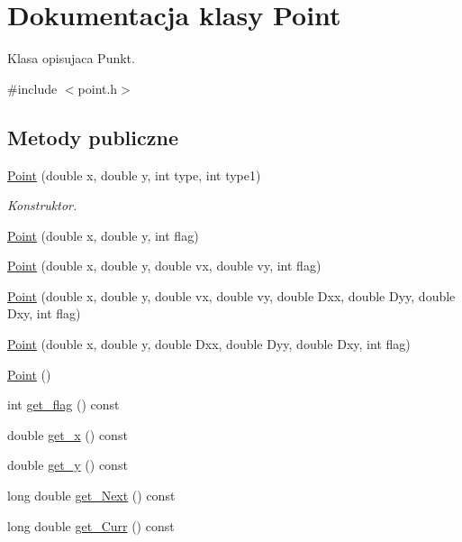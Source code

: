 \hypertarget{class_point}{}\section{Dokumentacja klasy Point}
\label{class_point}


Klasa opisujaca Punkt.  




{\ttfamily \#include $<$point.\+h$>$}

\subsection*{Metody publiczne}
\begin{DoxyCompactItemize}
\item 
\hyperlink{class_point_ac7a42329250c07c3f7e8c688ab1c1fcb}{Point} (double x, double y, int type, int type1)
\begin{DoxyCompactList}\small\item\em Konstruktor. \end{DoxyCompactList}\item 
\hyperlink{class_point_ac77aa12fe810c6a1409fb63c64a70521}{Point} (double x, double y, int flag)
\item 
\hyperlink{class_point_aa26891d8be99659f996873b6cf3e6a9c}{Point} (double x, double y, double vx, double vy, int flag)
\item 
\hyperlink{class_point_ac13d6b1e1fb4aa41b8f17d298afbb15e}{Point} (double x, double y, double vx, double vy, double Dxx, double Dyy, double Dxy, int flag)
\item 
\hyperlink{class_point_a29c1d7d3887b5df5fb43ece80c7ee633}{Point} (double x, double y, double Dxx, double Dyy, double Dxy, int flag)
\item 
\hyperlink{class_point_ad92f2337b839a94ce97dcdb439b4325a}{Point} ()
\item 
int \hyperlink{class_point_ae6971f02ce5cf409b2e3dec6f873a9df}{get\+\_\+flag} () const 
\item 
double \hyperlink{class_point_a2018e6c0f7d91b0aab42317de89fdaea}{get\+\_\+x} () const 
\item 
double \hyperlink{class_point_ac4f7350d9c545e907b0c513a03201c4b}{get\+\_\+y} () const 
\item 
long double \hyperlink{class_point_aaea8d464458b82d80848895b6d828db9}{get\+\_\+\+Next} () const 
\item 
long double \hyperlink{class_point_a7a14be44e32b2987324213788b3b0593}{get\+\_\+\+Curr} () const 
\item 

\end{DoxyCompactItemize}
